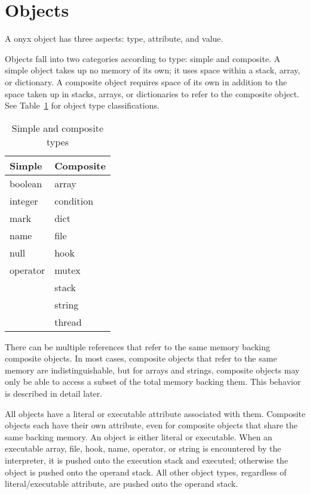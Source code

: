 \section{Objects}

A onyx object has three aspects: type, attribute, and value.

Objects fall into two categories according to type: simple and composite.  A
simple object takes up no memory of its own; it uses space within a stack,
array, or dictionary.  A composite object requires space of its own in addition
to the space taken up in stacks, arrays, or dictionaries to refer to the
composite object.  See Table~\ref{simple-composite} for object type
classifications.

\begin{table}[htb]
\begin{center}
\begin{tabular}{|l|l|}
\hline
Simple	& Composite	\\
\hline \hline
boolean	& array		\\
integer	& condition	\\
mark	& dict		\\
name	& file		\\
null	& hook		\\
operator & mutex	\\
	& stack		\\
        & string	\\
	& thread	\\
\hline
\end{tabular}
\label{simple-composite}
\end{center}
\caption{Simple and composite types}
\end{table}

There can be multiple references that refer to the same memory backing composite
objects.  In most cases, composite objects that refer to the same memory are
indistinguishable, but for arrays and strings, composite objects may only be
able to access a subset of the total memory backing them.  This behavior is
described in detail later.

All objects have a literal or executable attribute associated with them.
Composite objects each have their own attribute, even for composite objects that
share the same backing memory.  An object is either literal or executable.  When
an executable array, file, hook, name, operator, or string is encountered by the
interpreter, it is pushed onto the execution stack and executed; otherwise the
object is pushed onto the operand stack.  All other object types, regardless of
literal/executable attribute, are pushed onto the operand stack.

